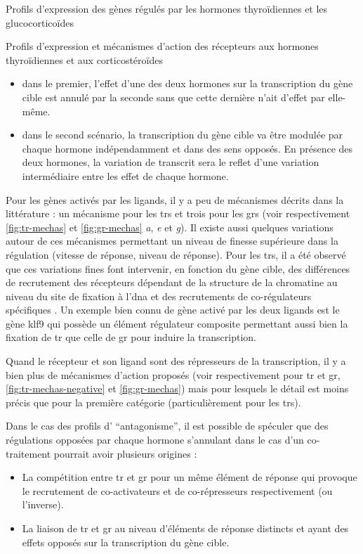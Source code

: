 \documentclass[../main.tex]{subfiles}
\begin{document}
\begin{chapter}{Profils d'expression des gènes régulés par les hormones thyroïdiennes et les glucocorticoïdes}
\begin{section}{Profils d'expression et mécanismes d'action des récepteurs aux hormones thyroïdiennes et aux corticostéroïdes}
\begin{itemize}
\item dans le premier, l'effet d'une des deux hormones sur la transcription du gène cible est annulé par la seconde sans que cette dernière n'ait d'effet par elle-même.
\item dans le second scénario, la transcription du gène cible va être modulée par chaque hormone indépendamment et dans des sens opposés.
En présence des deux hormones, la variation de transcrit sera le reflet d'une variation intermédiaire entre les effet de chaque hormone.
\end{itemize}
\par
Pour les gènes activés par les ligands, il y a peu de mécanismes décrits dans la littérature :
un mécanisme pour les \glspl{tr} et trois pour les \glspl{gr} (voir respectivement \autoref{fig:tr-mechas} et \autoref{fig:gr-mechas} \textit{a}, \textit{e} et \textit{g}).
Il existe aussi quelques variations autour de ces mécanismes permettant un niveau de finesse supérieure dans la régulation (vitesse de réponse, niveau de réponse).
Pour les \glspl{tr}, il a été observé que ces variations fines font intervenir, en fonction du gène cible, des différences de recrutement des récepteurs dépendant de la structure de la chromatine au niveau du site de fixation à l'\gls{dna} \citep{Bilesimo2011} et des recrutements de co-régulateurs spécifiques \citep{Havis2003}.
Un exemple bien connu de gène activé par les deux ligands est le gène \gls{klf9} qui possède un élément régulateur composite permettant aussi bien la fixation de \gls{tr} que celle de \gls{gr} pour induire la transcription.
\par
Quand le récepteur et son ligand sont des répresseurs de la transcription, il y a bien plus de mécanismes d'action proposés (voir respectivement pour \gls{tr} et \gls{gr}, \autoref{fig:tr-mechas-negative} et \autoref{fig:gr-mechas}) mais pour lesquels le détail est moins précis que pour la première catégorie (particulièrement pour les \glspl{tr}).
\par
Dans le cas des profils d' ``antagonisme'', il est possible de spéculer que des régulations opposées par chaque hormone s'annulant dans le cas d'un co-traitement pourrait avoir plusieurs origines :
\begin{itemize}
\item La compétition entre \gls{tr} et \gls{gr} pour un même élément de réponse qui provoque le recrutement de co-activateurs et de co-répresseurs respectivement (ou l'inverse).
\item La liaison de \gls{tr} et \gls{gr} au niveau d'éléments de réponse distincts et ayant des effets opposés sur la transcription du gène cible.

\end{itemize}
\end{section}
\end{chapter}
\end{document}
